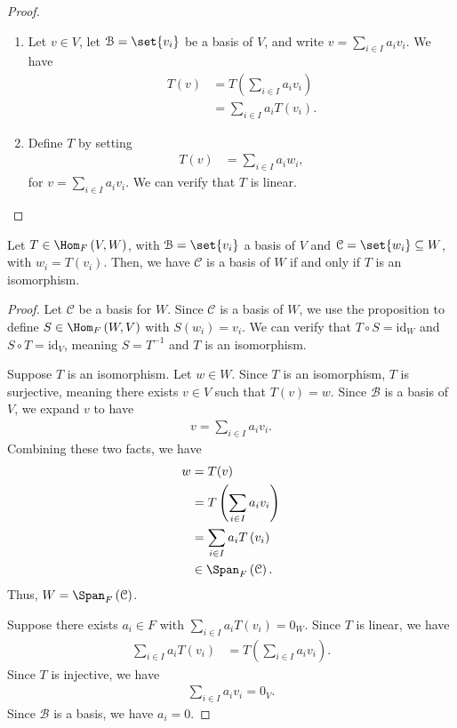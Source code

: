 \documentclass[10pt]{mypackage}
\begin{document}
\begin{proof}\hfill
  \begin{enumerate}[(1)]
    \item Let $v\in V$, let $\mathcal{B} = \set{v_i}$ be a basis of $V$, and write $v = \sum_{i\in I}a_iv_i$. We have
  \begin{align*}
    T\left(v\right) &= T\left(\sum_{i\in I}a_iv_i\right)\\
                    &= \sum_{i\in I}a_iT\left(v_i\right).
  \end{align*}
    \item  Define $T$ by setting
      \begin{align*}
        T\left(v\right) &= \sum_{i\in I}a_iw_i,
      \end{align*}
      for $v = \sum_{i\in I}a_iv_i$. We can verify that $T$ is linear.
  \end{enumerate}
\end{proof}
\begin{corollary}
  Let $T\in \Hom_{F}\left(V,W\right)$, with $\mathcal{B} = \set{v_i}$ a basis of $V$ and $\mathcal{C} = \set{w_i}\subseteq W$, with $w_i = T\left(v_i\right)$. Then, we have $\mathcal{C}$ is a basis of $W$ if and only if $T$ is an isomorphism.
\end{corollary}
\begin{proof}
  Let $\mathcal{C}$ be a basis for $W$. Since $\mathcal{C}$ is a basis of $W$, we use the proposition to define $S\in \Hom_{F}\left(W,V\right)$ with $S\left(w_i\right) = v_i$. We can verify that $T\circ S = \text{id}_{W}$ and $S\circ T = \text{id}_V$, meaning $S = T^{-1}$ and $T$ is an isomorphism.\newline

  Suppose $T$ is an isomorphism. Let $w\in W$. Since $T$ is an isomorphism, $T$ is surjective, meaning there exists $v\in V$ such that $T(v) = w$. Since $\mathcal{B}$ is a basis of $V$, we expand $v$ to have
  \begin{align*}
    v = \sum_{i\in I}a_iv_i.
  \end{align*}
  Combining these two facts, we have
  \begin{align*}
    w &= T(v)\\
      &= T\left(\sum_{i\in I}a_iv_i\right)\\
      &= \sum_{i\in I}a_iT\left(v_i\right)\\
      &\in \Span_{F}\left(\mathcal{C}\right).
  \end{align*}
  Thus, $W = \Span_{F}\left(\mathcal{C}\right)$.\newline

  Suppose there exists $a_i\in F$ with $\sum_{i\in I}a_iT\left(v_i\right) = 0_W$. Since $T$ is linear, we have
  \begin{align*}
    \sum_{i\in I}a_iT\left(v_i\right) &= T\left(\sum_{i\in I}a_iv_i\right).
  \end{align*}
  Since $T$ is injective, we have
  \begin{align*}
    \sum_{i\in I}a_iv_i = 0_V.
  \end{align*}
  Since $\mathcal{B}$ is a basis, we have $a_i = 0$.
\end{proof}
\end{document}
